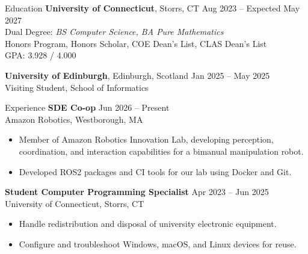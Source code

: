 \documentclass{resume}
\begin{document}

\begin{rSection}{Education}
    {\bf University of Connecticut}, Storrs, CT \hfill Aug 2023 -- Expected May 2027 \\
    Dual Degree: {\it BS Computer Science, BA Pure Mathematics} \\
    Honors Program, Honors Scholar, COE Dean's List, CLAS Dean's List \\
    GPA: 3.928 / 4.000

    {\bf University of Edinburgh}, Edinburgh, Scotland \hfill Jan 2025 -- May 2025 \\
    Visiting Student, School of Informatics

\end{rSection}


\begin{rSection}{Experience}
    \textbf{SDE Co-op} \hfill Jun 2026 -- Present \\
    Amazon Robotics, Westborough, MA
    \begin{itemize}
        \itemsep -4pt
        \item Member of Amazon Robotics Innovation Lab, developing perception, coordination, and interaction capabilities for a bimanual manipulation robot.
        \item Developed ROS2 packages and CI tools for our lab using Docker and Git.
    \end{itemize}

    \textbf{Student Computer Programming Specialist} \hfill Apr 2023 -- Jun 2025 \\
    University of Connecticut, Storrs, CT
    \begin{itemize}
        \itemsep -4pt
        \item Handle redistribution and disposal of university electronic equipment.
        \item Configure and troubleshoot Windows, macOS, and Linux devices for reuse.
    \end{itemize}
\end{rSection}
\end{document}
